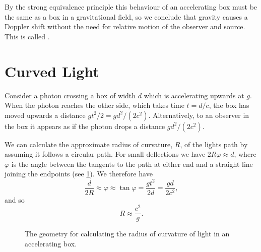 \documentclass[fleqn]{NotesClass}
\begin{document}
    By the strong equivalence principle this behaviour of an accelerating box must be the same as a box in a gravitational field, so we conclude that gravity causes a Doppler shift without the need for relative motion of the observer and source.
    This is called .
    
    \section{Curved Light}
    Consider a photon crossing a box of width \(d\) which is accelerating upwards at \(g\).
    When the photon reaches the other side, which takes time \(t = d/c\), the box has moved upwards a distance \(gt^2/2 = gd^2/(2c^2)\).
    Alternatively, to an observer in the box it appears as if the photon drops a distance \(gd^2/(2c^2)\).
    
    We can calculate the approximate radius of curvature, \(R\), of the lights path by assuming it follows a circular path.
    For small deflections we have \(2R\varphi \approx d\), where \(\varphi\) is the angle between the tangents to the path at either end and a straight line joining the endpoints (see \cref{fig:accelerating box light curve}).
    We therefore have
    \begin{equation}
        \frac{d}{2R} \approx \varphi \approx \tan\varphi = \frac{gt^2}{2d} = \frac{gd}{2c^2},
    \end{equation}
    and so
    \begin{equation}
        R \approx \frac{c^2}{g}.
    \end{equation}
    
    \begin{figure}
        \caption{The geometry for calculating the radius of curvature of light in an accelerating box.}
        \label{fig:accelerating box light curve}
    \end{figure}
\end{document}
